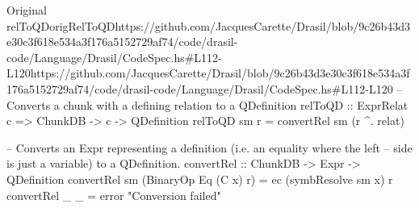 \begin{haskell}{Original relToQD}{origRelToQD}{https://github.com/JacquesCarette/Drasil/blob/9c26b43d3e30c3f618e534a3f176a5152729a\newline{}f74/code/drasil-code/Language/Drasil/CodeSpec.hs\#L112-L120}{https://github.com/JacquesCarette/Drasil/blob/9c26b43d3e30c3f618e534a3f176a5152729af74/code/drasil-code/Language/Drasil/CodeSpec.hs\#L112-L120}
-- Converts a chunk with a defining relation to a QDefinition
relToQD :: ExprRelat c => ChunkDB -> c -> QDefinition
relToQD sm r = convertRel sm (r ^. relat)

-- Converts an Expr representing a definition (i.e. an equality where the left 
-- side is just a variable) to a QDefinition.
convertRel :: ChunkDB -> Expr -> QDefinition
convertRel sm (BinaryOp Eq (C x) r) = ec (symbResolve sm x) r
convertRel _ _ = error "Conversion failed"
\end{haskell}
